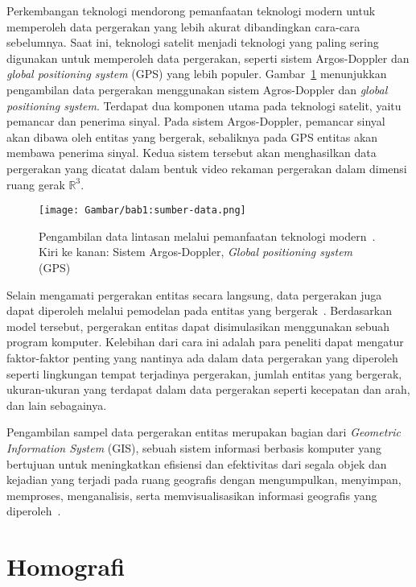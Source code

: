 Perkembangan teknologi mendorong pemanfaatan teknologi modern untuk memperoleh data pergerakan yang lebih akurat dibandingkan cara-cara sebelumnya. Saat ini, teknologi satelit menjadi teknologi yang paling sering digunakan untuk memperoleh data pergerakan, seperti sistem Argos-Doppler dan \textit{global positioning system} (GPS) yang lebih populer. Gambar~\ref{bab2:sumber-data} menunjukkan pengambilan data pergerakan menggunakan sistem Agros-Doppler dan \textit{global positioning system}. Terdapat dua komponen utama pada teknologi satelit, yaitu pemancar dan penerima sinyal. Pada sistem Argos-Doppler, pemancar sinyal akan dibawa oleh entitas yang bergerak, sebaliknya pada GPS entitas akan membawa penerima sinyal. Kedua sistem tersebut akan menghasilkan data pergerakan yang dicatat dalam bentuk video rekaman pergerakan dalam dimensi ruang gerak $\mathbb{R}^3$.

\begin{figure}[h]
    \centering
    \texttt{[image: Gambar/bab1:sumber-data.png]}
    \caption[Teknologi pengambilan data lintasan]{Pengambilan data lintasan melalui pemanfaatan teknologi modern~\cite{carter:argos}. Kiri ke kanan: Sistem Argos-Doppler, \textit{Global positioning system} (GPS)}
    \label{bab2:sumber-data}
\end{figure}

Selain mengamati pergerakan entitas secara langsung, data pergerakan juga dapat diperoleh melalui pemodelan pada entitas yang bergerak~\cite{wiratma:trajectory}. Berdasarkan model tersebut, pergerakan entitas dapat disimulasikan menggunakan sebuah program komputer. Kelebihan dari cara ini adalah para peneliti dapat mengatur faktor-faktor penting yang nantinya ada dalam data pergerakan yang diperoleh seperti lingkungan tempat terjadinya pergerakan, jumlah entitas yang bergerak, ukuran-ukuran yang terdapat dalam data pergerakan seperti kecepatan dan arah, dan lain sebagainya. 

Pengambilan sampel data pergerakan entitas merupakan bagian dari \textit{Geometric Information System} (GIS), sebuah sistem informasi berbasis komputer yang bertujuan untuk meningkatkan efisiensi dan efektivitas dari segala objek dan kejadian yang terjadi pada ruang geografis dengan mengumpulkan, menyimpan, memproses, menganalisis, serta memvisualisasikan informasi geografis yang diperoleh~\cite{longley:02:gis}.

\section{Homografi}
\label{sec:homography}

